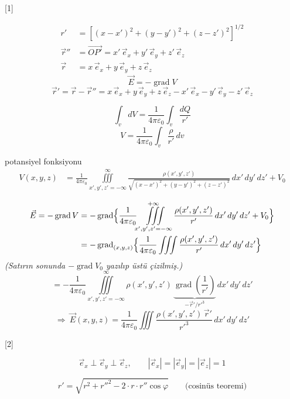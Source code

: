 \documentclass[11pt,a4paper]{article}
\begin{document}

[1]

\begin{align*}
r' &= \left[(x-x')^2 + (y-y')^2 + (z-z')^2\right]^{1/2}\\
\vec r'' &= \overrightarrow{OP'} = x'\,\vec e_x + y'\,\vec e_y + z'\,\vec e_z\\
\vec r &= x\,\vec e_x + y\,\vec e_y + z\,\vec e_z
\end{align*}
\[ \vec E = -\operatorname{grad}V \]
\[ \vec r' = \vec r - \vec r'' = x\,\vec e_x + y\,\vec e_y + z\,\vec e_z - x'\,\vec e_x - y'\,\vec e_y - z'\,\vec e_z \]

\[ \int_v dV = \frac{1}{4\pi\varepsilon_0}\int_v \frac{dQ}{r'} \]
\[ V = \frac{1}{4\pi\varepsilon_0}\int_v \frac{\rho}{r'}\,dv \]

\noindent potansiyel fonksiyonu
\begin{align*}
V(x,y,z) &= \frac{1}{4\pi\varepsilon_0}\iiint\limits_{x',y',z'=-\infty}^{\infty}\frac{\rho(x',y',z')}{\sqrt{(x-x')^2+(y-y')^2+(z-z')^2}}\,dx'\,dy'\,dz' + V_0
\end{align*}

\begin{align*}
\vec E = -\operatorname{grad}V &= -\operatorname{grad}\Bigl\{\frac{1}{4\pi\varepsilon_0}\iiint\limits_{x',y',z'=-\infty}^{+\infty}\frac{\rho(x',y',z')}{r'}\,dx'\,dy'\,dz' + V_0\Bigr\}\\
&= -\operatorname{grad}_{(x,y,z)}\Bigl\{\frac{1}{4\pi\varepsilon_0}\iiint\frac{\rho(x',y',z')}{r'}\,dx'\,dy'\,dz'\Bigr\}
\end{align*}
\noindent\textit{(Satırın sonunda $-\operatorname{grad}V_0$ yazılıp üstü çizilmiş.)}
\[ = -\frac{1}{4\pi\varepsilon_0}\iiint\limits_{x',y',z'=-\infty}^{\infty}\rho(x',y',z')\,\underbrace{\operatorname{grad}\!\left(\frac{1}{r'}\right)}_{-\vec r'/r'^{3}}\,dx'\,dy'\,dz' \]
\[ \Rightarrow\ \vec E(x,y,z) = \frac{1}{4\pi\varepsilon_0}\iiint\frac{\rho(x',y',z')\,\vec r'}{r'^{3}}\,dx'\,dy'\,dz' \]

[2]

\[ \vec e_x \perp \vec e_y \perp \vec e_z, \qquad |\vec e_x| = |\vec e_y| = |\vec e_z| = 1 \]

\[ r' = \sqrt{r^2 + r''^2 - 2\cdot r\cdot r''\cos\varphi} \qquad \text{(cosinüs teoremi)} \]
\end{document}
